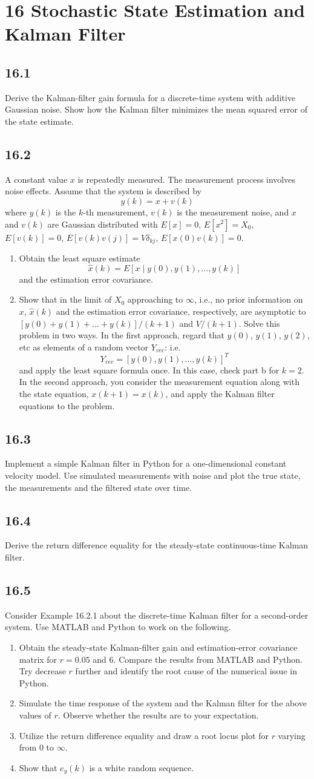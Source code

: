 \documentclass{article}
\newcommand{\problem}[2]{\subsection*{#1}}
\begin{document}
\section*{16 Stochastic State Estimation and Kalman Filter}

\problem{16.1}{}
Derive the Kalman-filter gain formula for a discrete-time system with additive Gaussian noise. Show how the Kalman filter minimizes the mean squared error of the state estimate.

\problem{16.2}{}
A constant value $x$ is repeatedly measured. The measurement process involves noise effects. Assume that the system is described by
\[
y(k) = x + v(k)
\]
where $y(k)$ is the $k$-th measurement, $v(k)$ is the measurement noise, and $x$ and $v(k)$ are Gaussian distributed with $E[x] = 0$, $E[x^2] = X_0$, $E[v(k)] = 0$, $E[v(k)v(j)] = V\delta_{kj}$, $E[x(0)v(k)] = 0$.
\begin{enumerate}
\item Obtain the least square estimate
\[
\widehat{x}(k) = E[x \mid y(0), y(1), \dots, y(k)]
\]
and the estimation error covariance.
\item Show that in the limit of $X_0$ approaching to $\infty$, i.e., no prior information on $x$, $\widehat{x}(k)$ and the estimation error covariance, respectively, are asymptotic to $[y(0) + y(1) + \dots + y(k)]/(k + 1)$ and $V/(k + 1)$. Solve this problem in two ways. In the first approach, regard that $y(0)$, $y(1)$, $y(2)$, etc as elements of a random vector $Y_{vec}$: i.e.
\[
Y_{vec} = [y(0), y(1), \dots, y(k)]^T
\]
and apply the least square formula once. In this case, check part b for $k = 2$. In the second approach, you consider the measurement equation along with the state equation, $x(k + 1) = x(k)$, and apply the Kalman filter equations to the problem.
\end{enumerate}

\problem{16.3}{}
Implement a simple Kalman filter in Python for a one-dimensional constant velocity model. Use simulated measurements with noise and plot the true state, the measurements and the filtered state over time.

\problem{16.4}{}
Derive the return difference equality for the steady-state continuous-time Kalman filter.

\problem{16.5}{}
Consider Example 16.2.1 about the discrete-time Kalman filter for a second-order system. Use MATLAB and Python to work on the following.
\begin{enumerate}
\item Obtain the steady-state Kalman-filter gain and estimation-error covariance matrix for $r = 0.05$ and $6$. Compare the results from MATLAB and Python. Try decrease $r$ further and identify the root cause of the numerical issue in Python.
\item Simulate the time response of the system and the Kalman filter for the above values of $r$. Observe whether the results are to your expectation.
\item Utilize the return difference equality and draw a root locus plot for $r$ varying from 0 to $\infty$.
\item Show that $e_y(k)$ is a white random sequence.
\end{enumerate}
\end{document}
